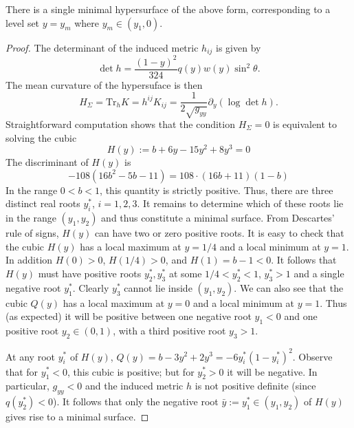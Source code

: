 \documentclass[10pt,a4paper]{amsart}
\begin{document}
\begin{prop} There is a single minimal hypersurface of the above form, corresponding to a level set $y = y_m$ where $y_m \in (y_1,0)$. 
\end{prop}

\begin{proof} The determinant of the induced metric $h_{ij}$ is given by
\begin{equation}
\det h = \frac{(1-y)^2}{324} q(y) w(y) \sin^2\theta.
\end{equation} The mean curvature of the hypersuface is then 
\begin{equation}
    H_\Sigma = \text{Tr}_h K = h^{ij}K_{ij} = \frac{1}{2\sqrt{g_{yy}}} \partial_y (\log \det h).
\end{equation} Straightforward computation shows that the condition $H_\Sigma=0$ is equivalent to solving the cubic
\begin{equation}
    H(y):=b + 6 y - 15 y^2 + 8 y^3 =0
\end{equation}  The discriminant of $H(y)$ is 
\begin{equation}
    -108 \left(16 b^2-5b - 11\right) = 108 \cdot  \left(16 b + 11\right)(1-b)
\end{equation} In the range $0 < b < 1$, this quantity is strictly positive. Thus, there are three distinct real roots $y^*_i$, $i=1,2,3$. It remains to determine which of these roots lie in the range $(y_1, y_2)$ and thus constitute a minimal surface. From Descartes' rule of signs, $H(y)$ can have two or zero positive roots. It is easy to check that the cubic $H(y)$ has a local maximum at $y = 1/4$ and a local minimum at $y = 1$. In addition $H(0) >0$, $H(1/4) > 0$, and $H(1) = b-1 < 0$. It follows that $H(y)$ must have positive roots $y_2^*, y_3^*$ at some $1/4 < y_2^* < 1$, $y_3^* > 1$ and a single negative root $y_1^*$. Clearly $y_3^*$ cannot lie inside $(y_1,y_2)$. We can also see that the cubic $Q(y)$ has a local maximum at $y = 0$ and a local minimum at $y = 1$. Thus (as expected) it will be positive between one negative root $y_1 <0$ and one positive root $y_2 \in (0,1)$, with a third positive root $y_3>1$. 

At any root $y_i^*$ of $H(y)$,  $Q(y) = b - 3y^2 + 2y^3 = -6 y_i^{*}(1 - y_i^{*})^2$. Observe that for $y_1^* < 0$, this cubic is positive; but for $y^*_2 > 0$ it will be negative. In particular, $g_{yy} < 0$ and the induced metric $h$ is not positive definite (since $q(y^*_2) < 0$). It follows that only the negative root $\bar{y}:=y_1^* \in (y_1,y_2)$ of $H(y)$ gives rise to a minimal surface. 
\end{proof}
\end{document}
